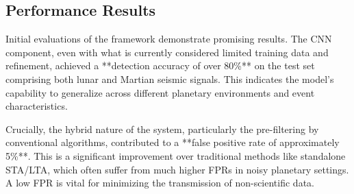 \documentclass[conference]{IEEEtran}
\begin{document}
        \subsection{Performance Results}
        Initial evaluations of the framework demonstrate promising results. The CNN component, even with what is
        currently considered limited training data and refinement, achieved a **detection accuracy of over 80\%** on the
        test set comprising both lunar and Martian seismic signals. This indicates the model's capability to generalize
        across different planetary environments and event characteristics.
        
        Crucially, the hybrid nature of the system, particularly the pre-filtering by conventional algorithms,
        contributed to a **false positive rate of approximately 5\%**. This is a significant improvement over
        traditional methods like standalone STA/LTA, which often suffer from much higher FPRs in noisy planetary
        settings. A low FPR is vital for minimizing the transmission of non-scientific data.
        
        
        
\end{document}
